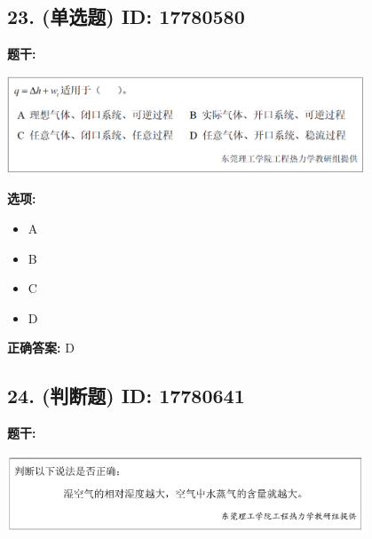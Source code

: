 \documentclass[12pt]{article}
\begin{document}
\vspace{0.5em}\hrulefill\vspace{1em}

\subsection*{23. (单选题) \small ID: 17780580}

\textbf{题干:}


\begin{center}\includegraphics[width=0.8\textwidth, height=0.25\textheight, keepaspectratio]{question_23_17780580/title_img_1.png}\end{center}

\textbf{选项:}
\begin{itemize}[leftmargin=*]
  \item A

  \item B

  \item C

  \item D

\end{itemize}

\textbf{正确答案:}
D

\vspace{0.5em}\hrulefill\vspace{1em}

\subsection*{24. (判断题) \small ID: 17780641}

\textbf{题干:}


\begin{center}\includegraphics[width=0.8\textwidth, height=0.25\textheight, keepaspectratio]{question_24_17780641/title_img_1.png}\end{center}
\end{document}
